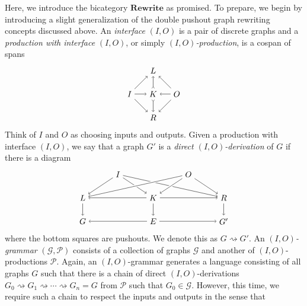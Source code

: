 \documentclass[11pt]{amsart}
\newcommand{\cat}[1]{\mathbf{#1}}
\theoremstyle{remark}
\theoremstyle{definition}
\begin{document}
Here, we introduce the bicategory $\cat{Rewrite}$ as promised.  To prepare, we begin by introducing a slight generalization of the double pushout graph rewriting concepts discussed above.  
An \emph{interface} $(I,O)$ is a pair of discrete graphs and a \emph{production with interface} $(I,O)$, or simply \emph{$(I,O)$-production}, is a cospan of spans
\[
\begin{tikzpicture}
	\node (I) at (-1,0) {$I$};
	\node (O) at (1,0) {$O$};
	\node (L) at (0,1) {$L$};
	\node (K) at (0,0) {$K$};
	\node (R) at (0,-1) {$R$};
	\draw [->] (I) edge (L);
	\draw [->] (I) edge (K);
	\draw [->] (I) edge (R);
	\draw [->] (O) edge (L);
	\draw [->] (O) edge (K);
	\draw [->] (O) edge (R);
	\draw [>->] (K) edge (L);
	\draw [>->] (K) edge (R);
\end{tikzpicture}
\]
Think of $I$ and $O$ as choosing inputs and outputs. Given a production with interface $(I,O)$, we say that a graph $G'$ is a \emph{direct $(I,O)$-derivation} of $G$ if there is a diagram
\[
\begin{tikzpicture}
	\node (I) at (1.5,2) {$I$};
	\node (O) at (4.5,2) {$O$};
	\node (L) at (0,1) {$L$};
	\node (K) at (3,1) {$K$};
	\node (R) at (6,1) {$R$};
	\node (G) at (0,0) {$G$};
	\node (E) at (3,0) {$E$};
	\node (G') at (6,0) {$G'$};
	\draw [->] (I) edge (L);
	\draw [->] (I) edge (K);
	\draw [->] (I) edge (R);
	\draw [->] (K) edge (L);
	\draw [->] (K) edge (E);
	\draw [->] (K) edge (R);
	\draw [->] (L) edge (G);
	\draw [->] (R) edge (G');
	\draw [->] (E) edge (G);
	\draw [->] (E) edge (G');
	\draw [-] (O) edge[white,line width=3pt] (L);
	\draw [->] (O) edge (L);
	\draw [-] (O) edge[white,line width=3pt] (K);
	\draw [->] (O) edge (K);
	\draw [-] (O) edge[white,line width=3pt] (R);
	\draw [->] (O) edge (R);
\end{tikzpicture}
\]
where the bottom squares are pushouts. We denote this as $G \rightsquigarrow G'$. An \emph{$(I,O)$-grammar} $(\mathcal{G},\mathcal{P})$ consists of a collection of graphs $\mathcal{G}$ and another of $(I,O)$-productions $\mathcal{P}$. Again, an $(I,O)$-grammar generates a language consisting of all graphs $G$ such that there is a chain of direct $(I,O)$-derivations $G_0 \rightsquigarrow G_1 \rightsquigarrow \dotsm \rightsquigarrow G_n=G$ from $\mathcal{P}$ such that $G_0 \in \mathcal{G}$. However, this time, we require such a chain to respect the inputs and outputs in the sense that 
\end{document}
